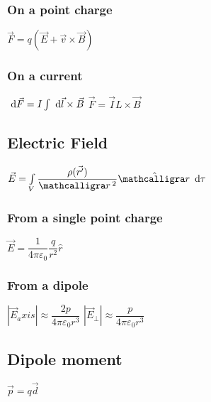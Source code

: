\subsubsection{On a point charge}
\begin{itemize}
\itemt \( \vec{F} = q(\vec{E}+\vec{v}\times \vec{B})\)
\end{itemize}

\subsubsection{On a current}
\begin{itemize}
\itemt \( \ \mathrm{d}\vec{F} = I \int \ \mathrm{d}\vec{l} \times \vec{B} \)
\itemt \( \vec{F} = \vec{I}L\times \vec{B} \)
\end{itemize}

		\subsection{Electric Field}
        
\begin{itemize}
\itemt \( \vec{E} = \int\limits_V \dfrac{\rho(\vec{r'})}{\scriptr ^2}\hat{\scriptr} \dn\tau \)
\end{itemize}

\subsubsection{From a single point charge}
\begin{itemize}
\itemt \( \vec{E} = \dfrac{1}{4\pi\varepsilon_0} \dfrac{q}{r^2} \hat{r} \)
\end{itemize}

\subsubsection{From a dipole}
\begin{itemize}
\itemt \( |\vec{E}_axis| \approx \dfrac{2p}{4\pi\varepsilon_0r^3} \)
\itemt \( |\vec{E}_\perp| \approx \dfrac{p}{4\pi\varepsilon_0r^3} \)
\end{itemize}

		\subsection{Dipole moment}
        
\begin{itemize}
\itemt \( \vec{p} = q\vec{d} \)
\end{itemize}

